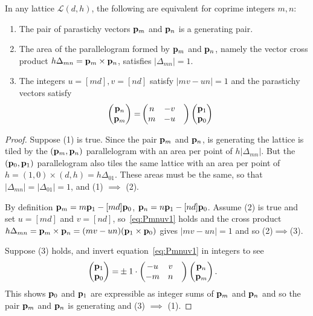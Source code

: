 \begin{theorem}
\label{thm:gLattice}
\label{thm:glattice}
	In any lattice $\mathcal{L}(d,h)$, the following are equivalent for coprime integers $m,n$:
	\begin{enumerate}
			\item The pair of parastichy vectors ${\mathbf p}_{m}$ and ${\mathbf p}_{n}$ is a generating pair.
\item The area of the parallelogram formed by ${\mathbf p}_{m}$ and ${\mathbf p}_{n}$, namely the vector cross product $h\Delta_{mn}={\mathbf p}_{m}\times{\mathbf p}_{n}$, satisfies
$|\Delta_{mn}|=1$. 	
		\item The integers $u=[md],v=[nd]$ satisfy $|mv-un|=1$ and the parastichy vectors	
		 satisfy 
	\begin{align}\label{eq:Pmnuv1}
			\begin{pmatrix}
			{\mathbf p}_{n} \\ {\mathbf p}_{m} 
		\end{pmatrix} = &
		\begin{pmatrix}
		n & - v 
		\\
		m &- u &
			\end{pmatrix}
		\begin{pmatrix}
			{\mathbf p}_{1}
			\\
			{\mathbf p}_{0}
		\end{pmatrix}
	\end{align}
	\end{enumerate}
\end{theorem}
\begin{proof}
	Suppose (1) is true. Since the pair  ${\mathbf p}_{m}$ and ${\mathbf p}_{n}$, is generating the lattice is tiled
	by the $({\mathbf p}_{m},{\mathbf p}_{n})$ parallelogram with an area per point of $h|\Delta_{mn}|$. But  the $({\mathbf p}_{0},{\mathbf p}_{1})$ parallelogram also tiles the same lattice with an area per point of $h= (1,0)\times(d,h)=h\Delta_{01}$. These areas must be the same, so that $|\Delta_{mn}|=|\Delta_{01}|=1$, and (1) $\implies$ (2). 
	
By definition ${\mathbf p}_{m}=m{\mathbf p}_{1}- [md]{\mathbf p}_{0}$,  ${\mathbf p}_{n}=n{\mathbf p}_{1}-[nd]{\mathbf p}_{0}$. Assume (2) is true  and set $u=[md]$ and $v=[nd]$, so~\eqref{eq:Pmnuv1} holds 
		and the cross product $h\Delta_{mn}={\mathbf p}_{m}\times{\mathbf p}_{n}=(m v - u n) ({\mathbf p}_{1} \times {\mathbf p}_{0})$ gives $|m v-un|=1$ and so
	 (2)$\implies$(3). 

Suppose (3) holds, and invert equation~\eqref{eq:Pmnuv1} in integers to see
	\begin{align}	
		\label{eq:Pmnuv2}
		\begin{pmatrix}
			{\mathbf p}_{1}
			\\
			{\mathbf p}_{0}
		\end{pmatrix} = & \pm 1 \cdot
		\begin{pmatrix}
			-u &  v 
			\\
			-m & n &
		\end{pmatrix}
		\begin{pmatrix}
			{\mathbf p}_{n} \\ {\mathbf p}_{m} 
		\end{pmatrix}. 
	\end{align}
This shows  ${\mathbf p}_{0}$ and ${\mathbf p}_{1}$ are expressible as integer sums of ${\mathbf p}_{m}$ and ${\mathbf p}_{n}$ and so the pair  ${\mathbf p}_{m}$ and ${\mathbf p}_{n}$ is generating and (3) $\implies$ (1). 

\end{proof}
